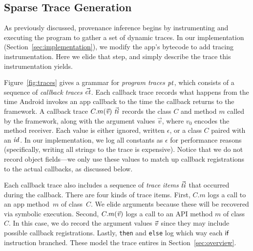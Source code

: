 \subsection{Sparse Trace Generation}
\label{sec:dynamic-analysis}
%
As previously discussed, provenance inference begins by instrumenting
and executing the program to gather a set of dynamic
traces. In our implementation (Section~\ref{sec:implementation}), we
modify the app's bytecode to add tracing instrumentation. Here
we elide that step, and simply describe the trace this instrumentation yields.

Figure~\ref{fig:traces} gives a grammar for \emph{program traces}
$\mathit{pt}$, which consists of a sequence of \emph{callback traces}
$\vec{\mathit{ct}}$. Each callback trace records what happens from the
time Android invokes an app callback to the time the callback returns to the
framework. A callback trace $C.m(\vec{\mathit{v}})\ \vec{\mathit{ti}}$
records the class $C$ and method $m$ called by the framework, along
with the argument values $\vec{v}$, where $v_0$ encodes the method
receiver. Each value is either ignored, written $\epsilon$, or a class $C$
paired with an $\mathit{id}$. In our implementation, we log all constants
as $\epsilon$ for performance reasons (specifically, writing all
strings to the trace is expensive).
Notice that we do not record object fields---we
only use these values to match up callback registrations to the actual
callbacks, as discussed below.

Each callback trace also includes a sequence of \emph{trace items}
$\vec{\mathit{ti}}$ that occurred during the callback.
There are four kinds of trace items. First, $C.m$ logs a call to an app
method~$m$ of class~$C$. We elide arguments because these will be
recovered via symbolic execution.
Second, $C.m(\vec{\mathit{v}})$ logs a call to an API method $m$ of class
$C$. In this case, we do record the argument values $\vec{\mathit{v}}$
since they may include possible callback registrations.
Lastly, \texttt{then} and \texttt{else} log
which way each $\textsf{if}$ instruction branched. These model the
 trace entires in Section~\ref{sec:overview}.


